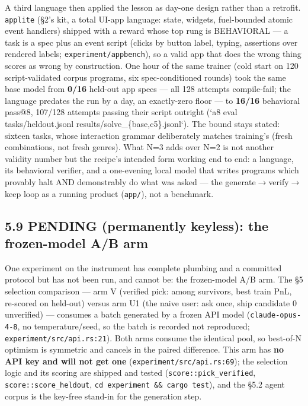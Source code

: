\documentclass[11pt]{article}
\newcommand{\code}[1]{\texttt{#1}}
\begin{document}
A third language then applied the lesson as day-one design rather than a
retrofit. \code{applite} (\S{}2's kit, a total UI-app language: state, widgets,
fuel-bounded atomic event handlers) shipped with a reward whose top rung is
BEHAVIORAL --- a task is a spec plus an event script (clicks by button label,
typing, assertions over rendered labels; \code{experiment/appbench}), so a valid
app that does the wrong thing scores as wrong by construction. One hour of
the same trainer (cold start on 120 script-validated corpus programs, six
spec-conditioned rounds) took the same base model from \textbf{0/16} held-out
app specs --- all 128 attempts compile-fail; the language predates the run by
a day, an exactly-zero floor --- to \textbf{16/16} behavioral pass@8, 107/128
attempts passing their script outright (`a8 eval tasks/heldout.jsonl
results/solve\_\{base,c5\}.jsonl`). The bound stays stated: sixteen tasks,
whose interaction grammar deliberately matches training's (fresh
combinations, not fresh genres). What N=3 adds over N=2 is not another
validity number but the recipe's intended form working end to end: a
language, its behavioral verifier, and a one-evening local model that
writes programs which provably halt AND demonstrably do what was asked ---
the generate$\rightarrow$verify$\rightarrow$keep loop as a running product
(\code{app/}), not a benchmark.

\subsection*{5.9 PENDING (permanently keyless): the frozen-model A/B arm}

One experiment on the instrument has complete plumbing and a committed protocol
but has not been run, and cannot be: the frozen-model A/B arm. The \S{}5 selection
comparison --- arm V (verified pick: among survivors, best train PnL, re-scored on
held-out) versus arm U1 (the naive user: ask once, ship candidate 0 unverified)
--- consumes a batch generated by a frozen API model (\code{claude-opus-4-8}, no
temperature/seed, so the batch is recorded not reproduced;
\code{experiment/src/api.rs:21}). Both arms consume the identical pool, so
best-of-N optimism is symmetric and cancels in the paired difference. This arm
has \textbf{no API key and will not get one} (\code{experiment/src/api.rs:69}); the
selection logic and its scoring are shipped and tested (\code{score::pick\_verified},
\code{score::score\_heldout}, \code{cd experiment \&\& cargo test}), and the \S{}5.2 agent
corpus is the key-free stand-in for the generation step.
\end{document}
